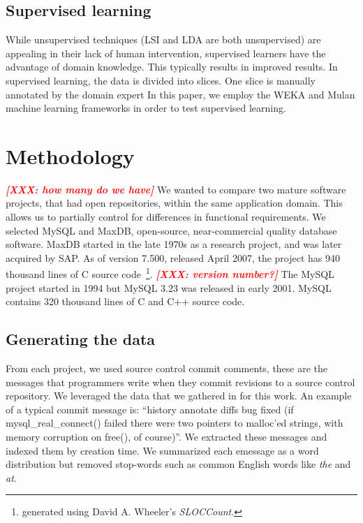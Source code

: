 \documentclass{acm_proc_article-sp}
\newcommand{\XXX}[1]{\textcolor{red}{{\it \textbf{[XXX: #1]}}}}
\begin{document}
\subsection{Supervised learning}
While unsupervised techniques (LSI and LDA are both unsupervised) are appealing in their lack of human intervention, supervised learners have the advantage of domain knowledge. This typically results in improved results. In supervised learning, the data is divided into slices. One slice is manually annotated by the domain expert
In this paper, we employ the WEKA and Mulan machine learning frameworks in order to test supervised learning.
 
\section{Methodology}

\begin{comment}
\end{comment}

\XXX{how many do we have}
We wanted to compare two mature software projects, that had open repositories, within the same application domain. This allows us to partially control for differences in functional requirements. We selected MySQL and MaxDB, open-source, near-commercial quality database software. MaxDB started in the late 1970s as a research project, and was later acquired by SAP. As of version 7.500, released April 2007, the project has 940 thousand lines of C source code~\footnote{generated using David A. Wheeler's \emph{SLOCCount}.}.
\XXX{version number?}
The MySQL project started in 1994 but MySQL 3.23 was released in early 2001. MySQL contains 320 thousand lines of C and C++ source code. 

\subsection{Generating the data}
From each project, we used source control commit comments, these are the messages that programmers write when they commit revisions to a source control repository. We leveraged the data that we gathered in \cite{Hindle09ICSM} for this work. An example of a typical commit message is: ``history annotate diffs bug fixed (if mysql\_real\_connect() failed there were two pointers to malloc'ed strings, with memory corruption on free(), of course)''. We extracted these messages and indexed them by creation time. We summarized each emessage as a word distribution but removed stop-words such as   common English words like \emph{the} and \emph{at}.
\end{document}
